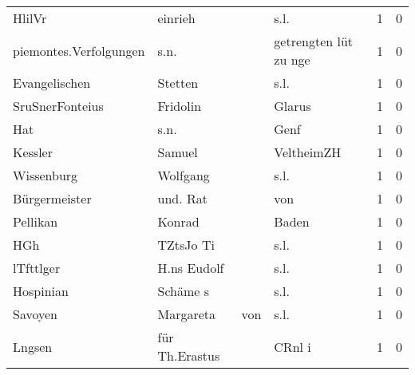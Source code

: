 \begin{center}
\begin{tiny}
\begin{longtabu}{llllrr}
                   HlilVr &                            einrieh &             &                                        s.l. &          1 &         0 \\
   piemontes.Verfolgungen &                               s.n. &             &                       getrengten lüt zu nge &          1 &         0 \\
            Evangelischen &                            Stetten &             &                                        s.l. &          1 &         0 \\
          SruSnerFonteius &                           Fridolin &             &                                      Glarus &          1 &         0 \\
                      Hat &                               s.n. &             &                                        Genf &          1 &         0 \\
                  Kessler &                             Samuel &             &                                  VeltheimZH &          1 &         0 \\
               Wissenburg &                           Wolfgang &             &                                        s.l. &          1 &         0 \\
            Bürgermeister &                           und. Rat &             &                                         von &          1 &         0 \\
                 Pellikan &                             Konrad &             &                                       Baden &          1 &         0 \\
                      HGh &                          TZtsJo Ti &             &                                        s.l. &          1 &         0 \\
                lTfttlger &                        H.ns Eudolf &             &                                        s.l. &          1 &         0 \\
                Hospinian &                           Schäme s &             &                                        s.l. &          1 &         0 \\
                  Savoyen &                          Margareta &         von &                                        s.l. &          1 &         0 \\
                   Lngsen &                     für Th.Erastus &             &                                      CRnl i &          1 &         0 \\

\end{longtabu}
\end{tiny}
\end{center}
